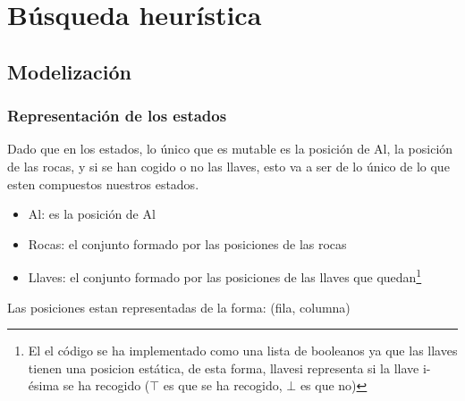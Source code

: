 \documentclass[11pt,spanish]{article}
\begin{document}
	\section{Búsqueda heurística}
		\subsection{Modelización}
			\subsubsection{Representación de los estados}
				Dado que en los estados, lo único que es mutable es la posición de Al, la posición de las rocas, y si se han cogido o no las llaves, esto va a ser de lo único de lo que esten compuestos nuestros estados.
				\begin{itemize}
					\item Al: es la posición de Al
					\item Rocas: el conjunto formado por las posiciones de las rocas
					\item Llaves: el conjunto formado por las posiciones de las llaves que quedan\footnote{El el código se ha implementado como una lista de booleanos ya que las llaves tienen una posicion estática, de esta forma, llavesi representa si la llave i-ésima se ha recogido ($\top$ es que se ha recogido, $\bot$ es que no)}
				\end{itemize}
				Las posiciones estan representadas de la forma: (fila, columna)
\end{document}
